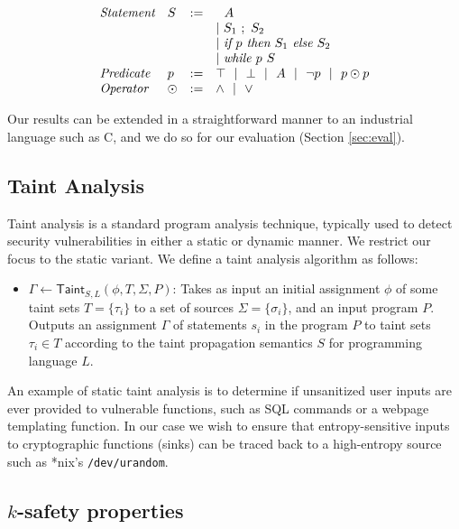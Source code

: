 \documentclass[letterpaper,twocolumn,10pt]{article}
\begin{document}
\begin{figure}
\caption{}
\label{fig:semrules}
\[
	\begin{array}{l l c l}
		\emph{Statement} & S & := & 
			\ \ A \\
			& & & |~ S_1\ ;\ S_2 \\
			& & & |~ \emph{if }p\emph{ then } S_1 \emph{ else } S_2 \\
			& & & |~ \emph{while }p\emph{ } S \\
		\emph{Predicate} & p &:=& \top ~~|~~ \bot ~~|~~ A ~~|~~ \lnot p ~~|~~ p \odot p \\
		\emph{Operator} & \odot &:=& \land ~~|~~ \lor \\
	\end{array}
\]
\end{figure}

Our results can be extended in a straightforward manner to an industrial language such as C, and we do so for our evaluation (Section \ref{sec:eval}).

\subsection{Taint Analysis}

Taint analysis is a standard program analysis technique, typically used to detect security vulnerabilities in either a static or dynamic manner. 
We restrict our focus to the static variant. We define a taint analysis algorithm as follows:

\begin{itemize}
    \item $\Gamma \gets \mathsf{Taint}_{S,L}(\phi, T, \Sigma, P)$: Takes as input an initial assignment $\phi$ of some taint sets $T = \{\tau_i\}$ to 
    a set of sources $\Sigma = \{\sigma_i\}$, and an input program $P$. Outputs an 
    assignment $\Gamma$ of statements $s_i$ in the program $P$ to taint sets $\tau_i \in T$ according to the taint propagation semantics $S$ for programming
    language $L$.
\end{itemize}


An example of static taint analysis is to determine if unsanitized user inputs are ever provided to vulnerable functions, such as SQL commands or
a webpage templating function. In our case we wish to ensure that entropy-sensitive inputs to cryptographic functions (sinks) can be
traced back to a high-entropy source such as *nix's \texttt{/dev/urandom}.

\subsection{$k$-safety properties}
\end{document}
